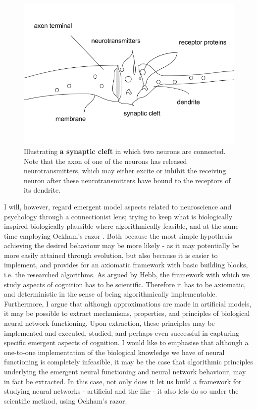 \begin{figure}
    \centering
    \includegraphics[width=12cm]{fig/synaptic-cleft}
    \caption{Illustrating \textbf{a synaptic cleft} in which two neurons are connected. Note that the axon of one of the neurons has released neurotransmitters, which may either excite or inhibit the receiving neuron after these neurotransmitters have bound to the receptors of its dendrite.}
    \label{fig:synaptic-cleft}
\end{figure}

I will, however, regard emergent model aspects related to neuroscience and psychology through a connectionist lens; trying to keep what is biologically inspired biologically plausible where algorithmically feasible, and at the same time employing Ockham's razor \citep{Russell2009chpt18}. Both because the most simple hypothesis achieving the desired behaviour may be more likely - as it may potentially be more easily attained through evolution, but also because it is easier to implement, and provides for an axiomatic framework with basic building blocks, i.e. the researched algorithms. As argued by Hebb, the framework with which we study aspects of cognition has to be scientific. Therefore it has to be axiomatic, and deterministic in the sense of being algorithmically implementable. Furthermore, I argue that although approximations are made in artificial models, it may be possible to extract mechanisms, properties, and principles of biological neural network functioning. Upon extraction, these principles may be implemented and executed, studied, and perhaps even successful in capturing specific emergent aspects of cognition. I would like to emphasise that although a one-to-one implementation of the biological knowledge we have of neural functioning is completely infeasible, it may be the case that algorithmic principles underlying the emergent neural functioning and neural network behaviour, may in fact be extracted. In this case, not only does it let us build a framework for studying neural networks - artificial and the like - it also lets do so under the scientific method, using Ockham's razor.


